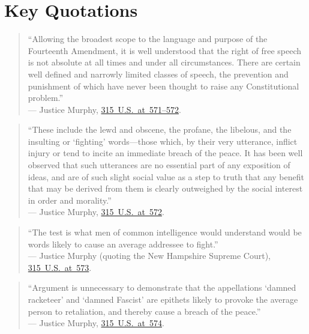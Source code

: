 \documentclass[12pt]{article}
\begin{document}
\section{Key Quotations}
\begin{quote}
``Allowing the broadest scope to the language and purpose of the Fourteenth Amendment, it is well understood that the right of free speech is not absolute at all times and under all circumstances. There are certain well defined and narrowly limited classes of speech, the prevention and punishment of which have never been thought to raise any Constitutional problem.'' \\
--- Justice Murphy, \href{https://supreme.justia.com/cases/federal/us/315/568/}{315~U.S.~at~571--572}.
\end{quote}

\begin{quote}
``These include the lewd and obscene, the profane, the libelous, and the insulting or `fighting' words---those which, by their very utterance, inflict injury or tend to incite an immediate breach of the peace. It has been well observed that such utterances are no essential part of any exposition of ideas, and are of such slight social value as a step to truth that any benefit that may be derived from them is clearly outweighed by the social interest in order and morality.'' \\
--- Justice Murphy, \href{https://supreme.justia.com/cases/federal/us/315/568/}{315~U.S.~at~572}.
\end{quote}

\begin{quote}
``The test is what men of common intelligence would understand would be words likely to cause an average addressee to fight.'' \\
--- Justice Murphy (quoting the New Hampshire Supreme Court), \href{https://supreme.justia.com/cases/federal/us/315/568/}{315~U.S.~at~573}.
\end{quote}

\begin{quote}
``Argument is unnecessary to demonstrate that the appellations `damned racketeer' and `damned Fascist' are epithets likely to provoke the average person to retaliation, and thereby cause a breach of the peace.'' \\
--- Justice Murphy, \href{https://supreme.justia.com/cases/federal/us/315/568/}{315~U.S.~at~574}.
\end{quote}
\end{document}
